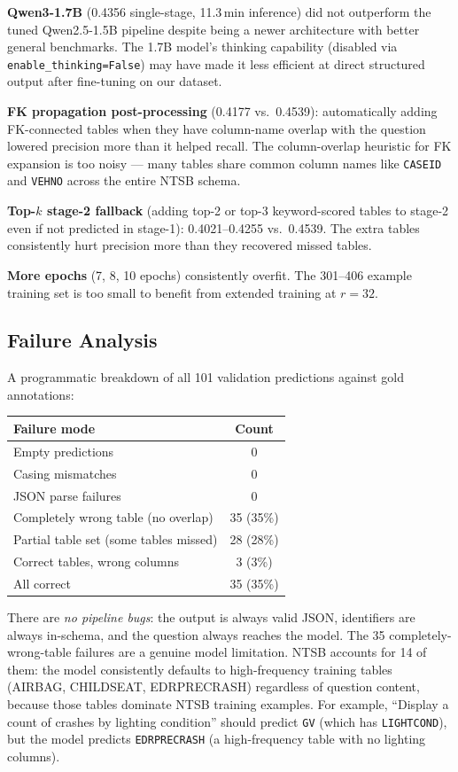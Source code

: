 \documentclass[10pt,twocolumn]{article}
\begin{document}
\textbf{Qwen3-1.7B} (0.4356 single-stage, 11.3\,min inference) did not outperform the tuned Qwen2.5-1.5B pipeline despite being a newer architecture with better general benchmarks. The 1.7B model's thinking capability (disabled via \texttt{enable\_thinking=False}) may have made it less efficient at direct structured output after fine-tuning on our dataset.

\textbf{FK propagation post-processing} (0.4177 vs.\ 0.4539): automatically adding FK-connected tables when they have column-name overlap with the question lowered precision more than it helped recall. The column-overlap heuristic for FK expansion is too noisy — many tables share common column names like \texttt{CASEID} and \texttt{VEHNO} across the entire NTSB schema.

\textbf{Top-$k$ stage-2 fallback} (adding top-2 or top-3 keyword-scored tables to stage-2 even if not predicted in stage-1): 0.4021--0.4255 vs.\ 0.4539. The extra tables consistently hurt precision more than they recovered missed tables.

\textbf{More epochs} (7, 8, 10 epochs) consistently overfit. The 301--406 example training set is too small to benefit from extended training at $r=32$.

\subsection*{Failure Analysis}

A programmatic breakdown of all 101 validation predictions against gold annotations:

\begin{center}
\small
\begin{tabular}{@{}lc@{}}
\toprule
Failure mode & Count \\
\midrule
Empty predictions & 0 \\
Casing mismatches & 0 \\
JSON parse failures & 0 \\
Completely wrong table (no overlap) & 35 (35\%) \\
Partial table set (some tables missed) & 28 (28\%) \\
Correct tables, wrong columns & 3 (3\%) \\
All correct & 35 (35\%) \\
\bottomrule
\end{tabular}
\end{center}

There are \textit{no pipeline bugs}: the output is always valid JSON, identifiers are always in-schema, and the question always reaches the model. The 35 completely-wrong-table failures are a genuine model limitation. NTSB accounts for 14 of them: the model consistently defaults to high-frequency training tables (AIRBAG, CHILDSEAT, EDRPRECRASH) regardless of question content, because those tables dominate NTSB training examples. For example, ``Display a count of crashes by lighting condition'' should predict \texttt{GV} (which has \texttt{LIGHTCOND}), but the model predicts \texttt{EDRPRECRASH} (a high-frequency table with no lighting columns).
\end{document}
